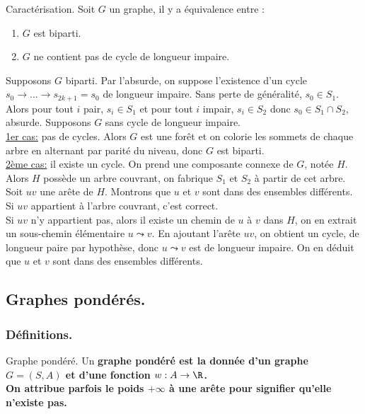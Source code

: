 \documentclass[french, 11pt]{article}
\begin{document}
\begin{thm}{Caractérisation.}{}{}
    Soit $G$ un graphe, il y a équivalence entre :
    \begin{enumerate}[topsep=0pt,itemsep=-0.9 ex]
        \item $G$ est biparti.
        \item $G$ ne contient pas de cycle de longueur impaire.
    \end{enumerate}
    \tcblower
    \fbox{$\ra$} Supposons $G$ biparti. Par l'absurde, on suppose l'existence d'un cycle $s_0\to...\to s_{2k+1}=s_0$ de longueur impaire.
    Sans perte de généralité, $s_0\in S_1$.\\
    Alors pour tout $i$ pair, $s_i\in S_1$ et pour tout $i$ impair, $s_i\in S_2$ donc $s_0\in S_1\cap S_2$, absurde.\n
    \fbox{$\la$} Supposons $G$ sans cycle de longueur impaire.\\
    \underline{1er cas:} pas de cycles. Alors $G$ est une forêt et on colorie les sommets de chaque arbre en alternant par parité du niveau, donc $G$ est biparti.\\
    \underline{2ème cas:} il existe un cycle. On prend une composante connexe de $G$, notée $H$. Alors $H$ possède un arbre couvrant, on fabrique $S_1$ et $S_2$ à partir de cet arbre.\\
    Soit $uv$ une arête de $H$. Montrons que $u$ et $v$ sont dans des ensembles différents.\\
    Si $uv$ appartient à l'arbre couvrant, c'est correct.\\
    Si $uv$ n'y appartient pas, alors il existe un chemin de $u$ à $v$ dans $H$, on en extrait un sous-chemin élémentaire $u \leadsto v$. En ajoutant l'arête $uv$, on obtient un cycle, de longueur paire par hypothèse, donc $u\leadsto v$ est de longueur impaire. On en déduit que $u$ et $v$ sont dans des ensembles différents.
\end{thm}

\subsection{Graphes pondérés.}

\subsubsection{Définitions.}

\begin{defi}{Graphe pondéré.}{}
    Un \bf{graphe pondéré} est la donnée d'un graphe $G=(S,A)$ et d'une fonction $w:A\to\R$.\\
    On attribue parfois le poids $+\infty$ à une arête pour signifier qu'elle n'existe pas.
\end{defi}
\end{document}
